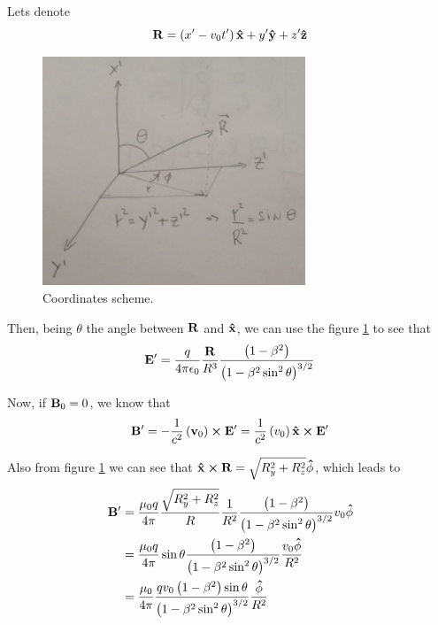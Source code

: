 \documentclass[oneside, 10pt, notitlepage]{book}
\begin{document}
Lets denote
\begin{equation}
    \vb{R} = \left(x' - v_0 t'\right)\vu{x} + y' \vu{y} + z'\vu{z}
\end{equation}
\begin{figure}[H]
    \centering
    \includegraphics[width=0.7\textwidth]{L14_12}
    \caption{Coordinates scheme.}
    \label{fig:L14_12}
\end{figure}
Then, being \(\theta\) the angle between \(\vb{R}\) and \(\vu{x}\), we can use the figure \ref{fig:L14_12} to see that
\begin{equation}
    \vb{E}' = \frac{q}{4\pi \epsilon_0}\frac{\vb{R}}{R^3}\frac{\left(1-\beta^2\right)}{\left(1-\beta^2 \sin^2\theta\right)^{3/2}}
\end{equation}

Now, if \(\vb{B}_0 = 0\), we know that 
\begin{equation}
    \vb{B}' = - \frac{1}{c^2}\left(\vb{v}_0\right)\cross \vb{E}' = \frac{1}{c^2}\left(v_0\right)\vu{x}\cross \vb{E}'
\end{equation}

Also from figure \ref{fig:L14_12} we can see that \(\vu{x}\cross \vb{R} = \sqrt{R_y^2 + R_z^2}\vu{\phi}\), which leads to 
\begin{equation}
\begin{split}
    \vb{B}' &= \frac{\mu_0 q}{4\pi}\frac{\sqrt{R_y^2 + R_z^2}}{R}\frac{1}{R^2}\frac{\left(1-\beta^2\right)}{\left(1-\beta^2 \sin^2\theta\right)^{3/2}} v_0 \vu{\phi} \\
    &= \frac{\mu_0 q}{4\pi} \sin\theta \frac{\left(1-\beta^2\right)}{\left(1-\beta^2 \sin^2\theta\right)^{3/2}} \frac{v_0 \vu{\phi}}{R^2}  \\
    &= \frac{\mu_0}{4\pi} \frac{q v_0 \left(1-\beta^2\right)\sin\theta}{\left(1-\beta^2 \sin^2\theta\right)^{3/2}} \frac{\vu{\phi}}{R^2} 
\end{split}
\end{equation}


\end{document}
